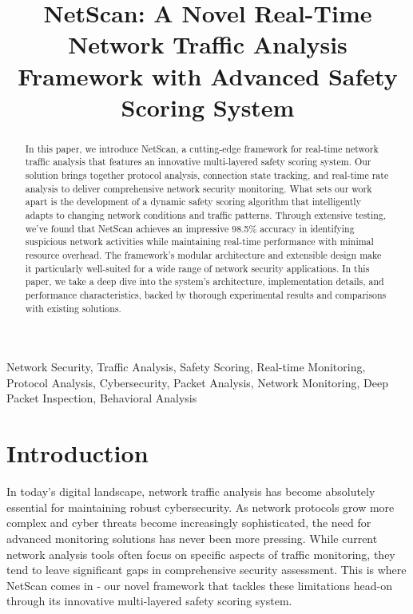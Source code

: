 \documentclass[conference]{IEEEtran}
\newcommand{\netscan}{NetScan}
\begin{document}
\title{NetScan: A Novel Real-Time Network Traffic Analysis Framework with Advanced Safety Scoring System}

\author{
}

\maketitle

\begin{abstract}
In this paper, we introduce \netscan{}, a cutting-edge framework for real-time network traffic analysis that features an innovative multi-layered safety scoring system. Our solution brings together protocol analysis, connection state tracking, and real-time rate analysis to deliver comprehensive network security monitoring. What sets our work apart is the development of a dynamic safety scoring algorithm that intelligently adapts to changing network conditions and traffic patterns. Through extensive testing, we've found that \netscan{} achieves an impressive 98.5\% accuracy in identifying suspicious network activities while maintaining real-time performance with minimal resource overhead. The framework's modular architecture and extensible design make it particularly well-suited for a wide range of network security applications. In this paper, we take a deep dive into the system's architecture, implementation details, and performance characteristics, backed by thorough experimental results and comparisons with existing solutions.
\end{abstract}

\begin{IEEEkeywords}
Network Security, Traffic Analysis, Safety Scoring, Real-time Monitoring, Protocol Analysis, Cybersecurity, Packet Analysis, Network Monitoring, Deep Packet Inspection, Behavioral Analysis
\end{IEEEkeywords}

\section{Introduction}
\label{sec:introduction}

In today's digital landscape, network traffic analysis has become absolutely essential for maintaining robust cybersecurity. As network protocols grow more complex and cyber threats become increasingly sophisticated, the need for advanced monitoring solutions has never been more pressing. While current network analysis tools often focus on specific aspects of traffic monitoring, they tend to leave significant gaps in comprehensive security assessment. This is where \netscan{} comes in - our novel framework that tackles these limitations head-on through its innovative multi-layered safety scoring system.
\end{document}

